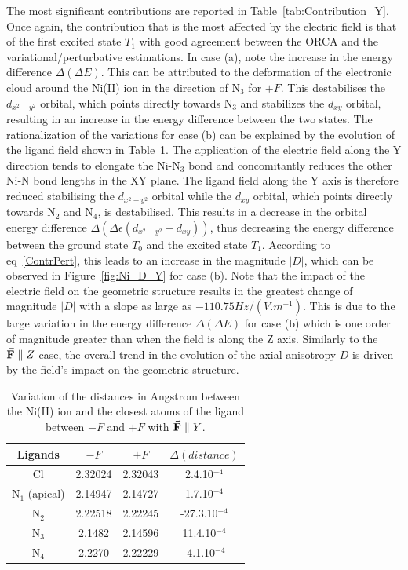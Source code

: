 \documentclass[12pt]{report}
\numberwithin{equation}{section}
\begin{document}
The most significant contributions are reported in Table~\ref{tab:Contribution_Y}. 
Once again, the contribution that is the most affected by the electric field is that of the first excited state $T_1$ with good agreement between the ORCA and the variational/perturbative estimations.
In case (a), note the increase in the energy difference $\Delta (\Delta E)$.
This can be attributed to the deformation of the electronic cloud around the Ni(II) ion in the direction of N$_3$ for $+F$. 
This destabilises the $d_{x^2-y^2}$ orbital, which points directly towards N$_3$ and stabilizes the $d_{xy}$ orbital, resulting in an increase in the energy difference between the two states.
The rationalization of the variations for case (b) can be explained by the evolution of the ligand field shown in Table~\ref{tab:DistanceY}.
The application of the electric field along the Y direction tends to elongate the Ni-N$_3$ bond and concomitantly reduces the other Ni-N bond lengths in the XY plane.
The ligand field along the Y axis is therefore reduced stabilising the $d_{x^2-y^2}$ orbital while the $d_{xy}$ orbital, which points directly towards N$_2$ and N$_4$, is destabilised. 
This results in a decrease in the orbital energy difference $\Delta (\Delta \epsilon (d_{x^2-y^2}-d_{xy}))$, thus decreasing the energy difference between the ground state $T_0$ and the excited state $T_1$.
According to eq~\ref{ContrPert}, this leads to an increase in the magnitude $|D|$, which can be observed in Figure~\ref{fig:Ni_D_Y} for case (b).
Note that the impact of the electric field on the geometric structure results in the greatest change of magnitude $|D|$ with a slope as large as $-110.75 Hz/(V.m^{-1})$.
This is due to the large variation in the energy difference $\Delta (\Delta E)$ for case (b) which is one order of magnitude greater than when the field is along the Z axis.
Similarly to the $\vec{\vb{F}}\parallel Z$ case, the overall trend in the evolution of the axial anisotropy $D$ is driven by the field's impact on the geometric structure.


\begin{table}[!ht]
    \centering
    \begin{tabular}{| c | c| c | c |}
        \hline
        Ligands & $-F$ & $+F$ &$\Delta(distance)$\\
        \hline
        Cl & 2.32024& 2.32043&  2.4.10$^{-4}$\\
        N$_1$ (apical) & 2.14947  & 2.14727 &1.7.10$^{-4}$\\
        N$_2$ & 2.22518& 2.22245&-27.3.10$^{-4}$ \\
        N$_3$ & 2.1482& 2.14596&11.4.10$^{-4}$ \\
        N$_4$ & 2.2270& 2.22229 &-4.1.10$^{-4}$\\
        \hline
    \end{tabular}
    \caption{Variation of the distances in Angstrom between the Ni(II) ion and the closest atoms of the ligand between $-F$ and $+F$ with $\vec{\vb{F}}\parallel Y$.}
    \label{tab:DistanceY}
\end{table}
\end{document}
